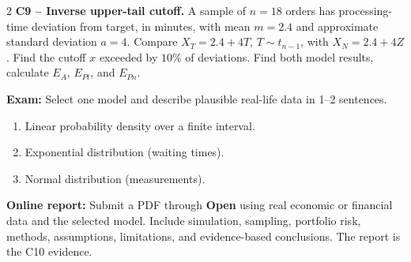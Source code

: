 \begin{multicols}{2}
\textbf{C9 -- Inverse upper-tail cutoff.} A sample of $n=18$ orders has processing-time deviation from target, in minutes, with mean $m=2.4$ and approximate standard deviation $a=4$. Compare $X_T=2.4+4T$, $T\sim t_{n-1}$, with $X_N=2.4+4Z$.
Find the cutoff $x$ exceeded by $10\%$ of deviations. Find both model results, calculate $E_A$, $E_{Pt}$, and $E_{Pn}$. 


\textbf{Exam:} Select one model and describe plausible real-life data in 1--2 sentences. 
\begin{enumerate}[label=\textbf{(\alph*)},leftmargin=*]
	\item Linear probability density over a finite interval.
	\item Exponential distribution (waiting times).
	\item Normal distribution (measurements).
\end{enumerate}

\textbf{Online report:} Submit a PDF through \textbf{Open} using real economic or financial data and the selected model. Include simulation, sampling, portfolio risk, methods, assumptions, limitations, and evidence-based conclusions. The report is the C10 evidence.

\end{multicols}

